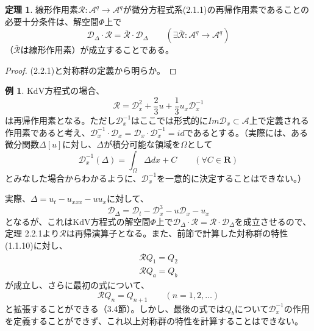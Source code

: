 \documentclass[a4paper, 11pt]{report}
\theoremstyle{definition}
\newtheorem{theorem}{定理}[section]
\newtheorem*{example*}{例}
\begin{document}
\begin{theorem}
 線形作用素$\mathcal{R} : \mathcal{A}^q\longrightarrow \mathcal{A}^q$が微分方程式系(2.1.1)の再帰作用素であることの必要十分条件は、解空間$\Phi$上で
\begin{equation*}
\mathcal{D}_\varDelta\cdot \mathcal{R} = \bar{\mathcal{R}}\cdot \mathcal{D}_\varDelta\qquad (\exists \bar{\mathcal{R}}: \mathcal{A}^q\longrightarrow \mathcal{A}^q)
\end{equation*}
（$\bar{\mathcal{R}}$は線形作用素）が成立することである。
\end{theorem}

\begin{proof}
 (2.2.1)と対称群の定義から明らか。
\end{proof}

\begin{example*}
 KdV方程式の場合、
\begin{equation*}
\mathcal{R} = \mathcal{D}_x^2 + \frac{2}{3}u + \frac{1}{3}u_x\mathcal{D}_x^{-1}
\end{equation*}
は再帰作用素となる。ただし$\mathcal{D}_x^{-1}$はここでは形式的に$Im\mathcal{D}_x\subset \mathcal{A}$上で定義される作用素であると考え、$\mathcal{D}_x^{-1}\cdot \mathcal{D}_x=\mathcal{D}_x\cdot \mathcal{D}_x^{-1}=id$であるとする。（実際には、ある微分関数$\Delta[u]$に対し、$\Delta$が積分可能な領域を$\Omega$として
\begin{equation*}
\mathcal{D}_x^{-1}(\Delta)=\int_\Omega\Delta dx+C \qquad (\forall C\in\mathbf{R})
\end{equation*}
とみなした場合からわかるように、$\mathcal{D}_x^{-1}$を一意的に決定することはできない。）

 実際、$\varDelta=u_t-u_{xxx}-uu_x$に対して、
\begin{equation*}
\mathcal{D}_\varDelta = \mathcal{D}_t - \mathcal{D}_x^3 - u\mathcal{D}_x - u_x
\end{equation*}
となるが、これはKdV方程式の解空間$\Phi$上で$\mathcal{D}_\varDelta\cdot \mathcal{R}=\mathcal{R}\cdot \mathcal{D}_\varDelta$を成立させるので、定理 2.2.1より$\mathcal{R}$は再帰演算子となる。また、前節で計算した対称群の特性(1.1.10)に対し、
\begin{align*}
\mathcal{R}Q_1 = Q_2 \\
\mathcal{R}Q_a = Q_b
\end{align*}
が成立し、さらに最初の式について、
\begin{equation}
\mathcal{R}Q_{n} = Q_{n+1}\qquad (n=1,2,\dots) %
\end{equation}
と拡張することができる（3.4節）。しかし、最後の式では$Q_b$について$\mathcal{D}_x^{-1}$の作用を定義することができず、これ以上対称群の特性を計算することはできない。
\end{example*}
\end{document}
